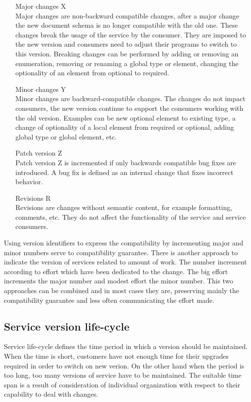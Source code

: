 \begin{enumerate}
  \item[Major changes X] \hfill \\
  Major changes are non-backward compatible changes, after a major change the new document schema is no longer compatible with the old one. These changes break the usage of the service by the consumer. They are imposed to the new version and consumers need to adjust their programs to switch to this version. Breaking changes can be performed by adding or removing an enumeration, removing or renaming a global type or element, changing the optionality of an element from optional to required.
  
    \item[Minor changes Y] \hfill \\
  Minor changes are backward-compatible changes. The changes do not impact consumers, the new version continue to support the consumers working with the old version. Examples can be new optional element to existing type, a change of optionality of a local element from required or optional, adding global type or global element, etc.
  
  \item[Patch version Z] \hfill \\  
  Patch version Z is incremented if only backwards compatible bug fixes are introduced. A bug fix is defined as an internal change that fixes incorrect behavior.
  
  \item[Revisions R] \hfill \\ 
  Revisions are changes without semantic content, for example formatting, comments, etc. They do not affect the functionality of the service and service consumers.
\end{enumerate} 

Using version identifiers to express the compatibility by incrementing major and minor numbers serve to compatibility guarantee. There is another approach to indicate the version of services related to amount of work. The number increment according to effort which have been dedicated to the change. The big effort increments the major number and modest effort the minor number. This two approaches can be combined and in most cases they are, preserving mainly the compatibility guarantee and less often communicating the effort made. \cite{soa-governance}


\subsection{Service version life-cycle}
Service life-cycle defines the time period in which a version should be maintained. When the time is short, customers have not enough time for their upgrades required in order to switch on new verion. On the other hand when the period is too long, too many versions of service have to be maintained. The suitable time span is a result of consideration of individual organization with respect to their capability to deal with changes.

